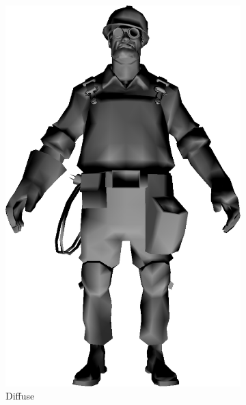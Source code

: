 \begin{figure}[h]
\begin{subfigure}[b]{0.16\textwidth}
        \includegraphics[width=\textwidth]{img/Lighting/diffuse.png}
        \caption{Diffuse}
        \label{fig:diffuse}
    \end{subfigure}
     ~
    \centering
    \begin{subfigure}[b]{0.16\textwidth}

\end{subfigure}
\end{figure}
